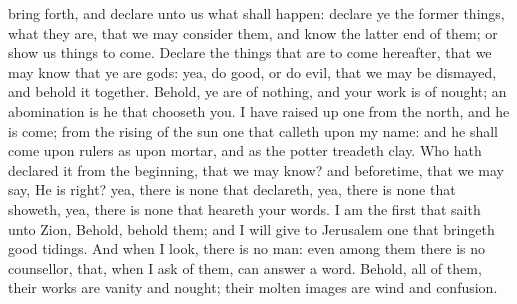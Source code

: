 bring forth, and declare unto us what shall happen: declare ye the former things, what they are, that we may consider them, and know the latter end of them; or show us things to come. Declare the things that are to come hereafter, that we may know that ye are gods: yea, do good, or do evil, that we may be dismayed, and behold it together. Behold, ye are of nothing, and your work is of nought; an abomination is he that chooseth you.  I have raised up one from the north, and he is come; from the rising of the sun one that calleth upon my name: and he shall come upon rulers as upon mortar, and as the potter treadeth clay. Who hath declared it from the beginning, that we may know? and beforetime, that we may say, He is right? yea, there is none that declareth, yea, there is none that showeth, yea, there is none that heareth your words. I am the first that saith unto Zion, Behold, behold them; and I will give to Jerusalem one that bringeth good tidings. And when I look, there is no man: even among them there is no counsellor, that, when I ask of them, can answer a word. Behold, all of them, their works are vanity and nought; their molten images are wind and confusion. 

